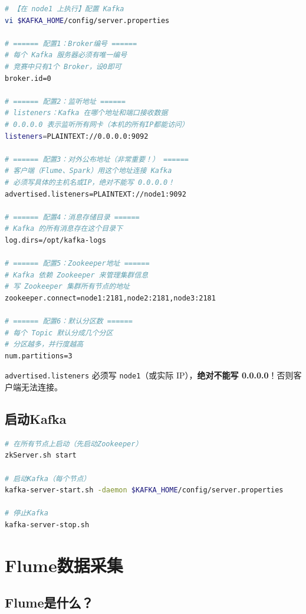 \documentclass[12pt,a4paper]{article}
\begin{document}
\begin{lstlisting}[language=bash]
# 【在 node1 上执行】配置 Kafka
vi $KAFKA_HOME/config/server.properties

# ====== 配置1：Broker编号 ======
# 每个 Kafka 服务器必须有唯一编号
# 竞赛中只有1个 Broker，设0即可
broker.id=0

# ====== 配置2：监听地址 ======
# listeners：Kafka 在哪个地址和端口接收数据
# 0.0.0.0 表示监听所有网卡（本机的所有IP都能访问）
listeners=PLAINTEXT://0.0.0.0:9092

# ====== 配置3：对外公布地址（非常重要！） ======
# 客户端（Flume、Spark）用这个地址连接 Kafka
# 必须写具体的主机名或IP，绝对不能写 0.0.0.0！
advertised.listeners=PLAINTEXT://node1:9092

# ====== 配置4：消息存储目录 ======
# Kafka 的所有消息存在这个目录下
log.dirs=/opt/kafka-logs

# ====== 配置5：Zookeeper地址 ======
# Kafka 依赖 Zookeeper 来管理集群信息
# 写 Zookeeper 集群所有节点的地址
zookeeper.connect=node1:2181,node2:2181,node3:2181

# ====== 配置6：默认分区数 ======
# 每个 Topic 默认分成几个分区
# 分区越多，并行度越高
num.partitions=3
\end{lstlisting}

\begin{warnbox}[重要]
\texttt{advertised.listeners} 必须写 \texttt{node1}（或实际 IP），\textbf{绝对不能写 0.0.0.0}！否则客户端无法连接。
\end{warnbox}

\subsection{启动Kafka}

\begin{lstlisting}[language=bash]
# 在所有节点上启动（先启动Zookeeper）
zkServer.sh start

# 启动Kafka（每个节点）
kafka-server-start.sh -daemon $KAFKA_HOME/config/server.properties

# 停止Kafka
kafka-server-stop.sh
\end{lstlisting}

\section{Flume数据采集}

\subsection{Flume是什么？}
\end{document}

